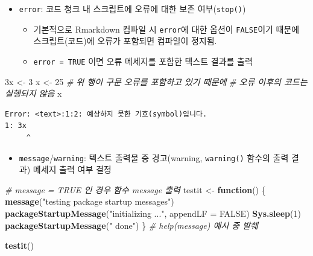 \documentclass[
  11pt,
]{krantz}
\newenvironment{Shaded}{\begin{snugshade}}{\end{snugshade}}
\newcommand{\CommentTok}[1]{\textcolor[rgb]{0.37,0.37,0.37}{\textit{#1}}}
\newcommand{\ControlFlowTok}[1]{\textcolor[rgb]{0.27,0.27,0.27}{\textbf{#1}}}
\newcommand{\DataTypeTok}[1]{\textcolor[rgb]{0.27,0.27,0.27}{#1}}
\newcommand{\DecValTok}[1]{\textcolor[rgb]{0.06,0.06,0.06}{#1}}
\newcommand{\KeywordTok}[1]{\textcolor[rgb]{0.27,0.27,0.27}{\textbf{#1}}}
\newcommand{\NormalTok}[1]{#1}
\newcommand{\OtherTok}[1]{\textcolor[rgb]{0.37,0.37,0.37}{#1}}
\newcommand{\StringTok}[1]{\textcolor[rgb]{0.5,0.5,0.5}{#1}}
\providecommand{\tightlist}{%
  \setlength{\itemsep}{0pt}\setlength{\parskip}{0pt}}
\begin{document}
\normalsize

\begin{itemize}
\tightlist
\item
  \texttt{error}: 코드 청크 내 스크립트에 오류에 대한 보존 여부(\texttt{stop()})

  \begin{itemize}
  \tightlist
  \item
    기본적으로 Rmarkdown 컴파일 시 \texttt{error}에 대한 옵션이 \texttt{FALSE}이기 때문에 스크립트(코드)에 오류가 포함되면 컴파일이 정지됨.
  \item
    \texttt{error\ =\ TRUE} 이면 오류 메세지를 포함한 텍스트 결과를 출력
  \end{itemize}
\end{itemize}

\footnotesize

\begin{Shaded}
\begin{Highlighting}[]
\NormalTok{3x <-}\StringTok{ }\DecValTok{3}
\NormalTok{x <-}\StringTok{ }\DecValTok{25} \CommentTok{# 위 행이 구문 오류를 포함하고 있기 때문에}
        \CommentTok{# 오류 이후의 코드는 실행되지 않음}
\NormalTok{x}
\end{Highlighting}
\end{Shaded}

\begin{verbatim}
Error: <text>:1:2: 예상하지 못한 기호(symbol)입니다.
1: 3x
     ^
\end{verbatim}

\normalsize

\begin{itemize}
\tightlist
\item
  \texttt{message}/\texttt{warning}: 텍스트 출력물 중 경고(warning, \texttt{warning()} 함수의 출력 결과) 메세지 출력 여부 결정
\end{itemize}

\footnotesize

\begin{Shaded}
\begin{Highlighting}[]
\CommentTok{# message = TRUE 인 경우 함수 message 출력}
\NormalTok{testit <-}\StringTok{ }\ControlFlowTok{function}\NormalTok{() \{}
  \KeywordTok{message}\NormalTok{(}\StringTok{"testing package startup messages"}\NormalTok{)}
  \KeywordTok{packageStartupMessage}\NormalTok{(}\StringTok{"initializing ..."}\NormalTok{, }\DataTypeTok{appendLF =} \OtherTok{FALSE}\NormalTok{)}
  \KeywordTok{Sys.sleep}\NormalTok{(}\DecValTok{1}\NormalTok{)}
  \KeywordTok{packageStartupMessage}\NormalTok{(}\StringTok{" done"}\NormalTok{)}
\NormalTok{\} }\CommentTok{# help(message) 예시 중 발췌}

\KeywordTok{testit}\NormalTok{()}
\end{Highlighting}
\end{Shaded}
\end{document}
